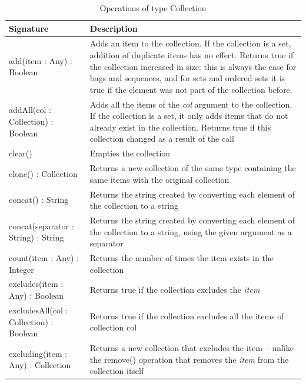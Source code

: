 \begin{longtabu} {|p{6.5cm}|X|}
\caption{Operations of type Collection}
\label{tab:Collection Operations}\\
\hline
    \textbf{Signature} & \textbf{Description} \\\hline
    add(item : Any) : Boolean & Adds an item to the collection. If the collection is a set, addition of duplicate items has no effect. Returns true if the collection increased in size: this is always the case for bags and sequences, and for sets and ordered sets it is true if the element was not part of the collection before. \\\hline
    
    addAll(col : Collection) : Boolean & Adds all the items of the \emph{col} argument to the collection. If the collection is a set, it only adds items that do not already exist in the collection. Returns true if this collection changed as a result of the call\\\hline
    
    clear() & Empties the collection \\\hline
    
    clone() : Collection & Returns a new collection of the same type containing the same items with the original collection \\\hline
    
    concat() : String & Returns the string created by converting each element of the collection to a string \\\hline
    
    concat(separator : String) : String & Returns the string created by converting each element of the collection to a string, using the given argument as a separator \\\hline
    
    count(item : Any) : Integer & Returns the number of times the item exists in the collection \\\hline
    
    excludes(item : Any) : Boolean & Returns true if the collection excludes the \emph{item} \\\hline
    
    excludesAll(col : Collection) : Boolean & Returns true if the collection excludes all the items of collection col \\\hline
    
    excluding(item : Any) : Collection & Returns a new collection that excludes the item -- unlike the remove() operation that removes the \emph{item} from the collection itself\\\hline
    

\end{longtabu}
